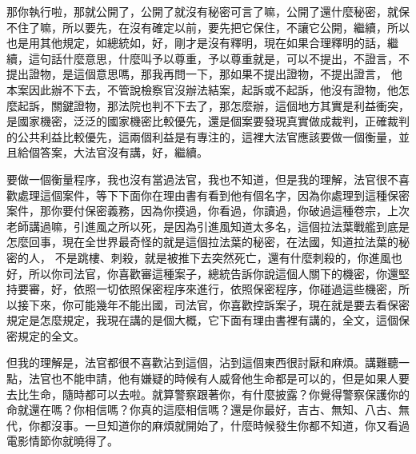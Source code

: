 \hypertarget{c11:cue:220}{}那你執行啦，那就公開了，公開了就沒有秘密可言了嘛，公開了還什麼秘密，就保不住了嘛，所以要先，在沒有確定以前，要先把它保住，不讓它公開，繼續，所以也是用其他規定，如總統如，好，剛才是沒有釋明，現在如果合理釋明的話，繼續，這句話什麼意思，什麼叫予以尊重，予以尊重就是，可以不提出，不證言，不提出證物，是這個意思嗎，那我再問一下，那如果不提出證物，不提出證言，
\hypertarget{c11:cue:221}{}他本案因此辦不下去，不管說檢察官沒辦法結案，起訴或不起訴，他沒有證物，他怎麼起訴，關鍵證物，那法院也判不下去了，那怎麼辦，這個地方其實是利益衝突，是國家機密，泛泛的國家機密比較優先，還是個案要發現真實做成裁判，正確裁判的公共利益比較優先，這兩個利益是有專注的，這裡大法官應該要做一個衡量，並且給個答案，大法官沒有講，好，繼續。

\hypertarget{c11:cue:222}{}要做一個衡量程序，我也沒有當過法官，我也不知道，但是我的理解，法官很不喜歡處理這個案件，等下下面你在理由書有看到他有個名字，因為你處理到這種保密案件，那你要付保密義務，因為你摸過，你看過，你讀過，你破過這種卷宗，上次老師講過嘛，引進風之所以死，是因為引進風知道太多名，這個拉法葉戰艦到底是怎麼回事，現在全世界最奇怪的就是這個拉法葉的秘密，在法國，知道拉法葉的秘密的人，
\hypertarget{c11:cue:223}{}不是跳樓、刺殺，就是被推下去突然死亡，還有什麼刺殺的，你進風也好，所以你司法官，你喜歡審這種案子，總統告訴你說這個人關下的機密，你還堅持要審，好，依照一切依照保密程序來進行，依照保密程序，你碰過這些機密，所以接下來，你可能幾年不能出國，司法官，你喜歡控訴案子，現在就是要去看保密規定是怎麼規定，我現在講的是個大概，它下面有理由書裡有講的，全文，這個保密規定的全文。

\hypertarget{c11:cue:224}{}但我的理解是，法官都很不喜歡沾到這個，沾到這個東西很討厭和麻煩。講難聽一點，法官也不能申請，他有嫌疑的時候有人威脅他生命都是可以的，但是如果人要去比生命，隨時都可以去啦。就算警察跟著你，有什麼披露？你覺得警察保護你的命就還在嗎？你相信嗎？你真的這麼相信嗎？還是你最好，吉古、無知、八古、無代，你都沒事。一旦知道你的麻煩就開始了，什麼時候發生你都不知道，你又看過電影情節你就曉得了。

